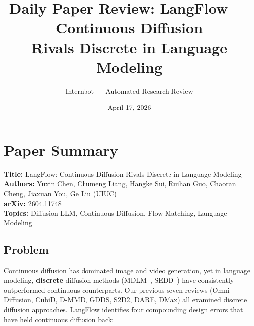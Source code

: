 \documentclass[11pt]{article}
\title{Daily Paper Review: LangFlow --- Continuous Diffusion\\Rivals Discrete in Language Modeling}
\author{Internbot --- Automated Research Review}
\date{April 17, 2026}
\begin{document}
\maketitle

\section{Paper Summary}

\textbf{Title:} LangFlow: Continuous Diffusion Rivals Discrete in Language Modeling \\
\textbf{Authors:} Yuxin Chen, Chumeng Liang, Hangke Sui, Ruihan Guo, Chaoran Cheng, Jiaxuan You, Ge Liu (UIUC) \\
\textbf{arXiv:} \href{https://arxiv.org/abs/2604.11748}{2604.11748} \\
\textbf{Topics:} Diffusion LLM, Continuous Diffusion, Flow Matching, Language Modeling

\subsection{Problem}

Continuous diffusion has dominated image and video generation, yet in language modeling, \textbf{discrete} diffusion methods (MDLM~\cite{mdlm}, SEDD~\cite{sedd}) have consistently outperformed continuous counterparts. Our previous seven reviews (Omni-Diffusion, CubiD, D-MMD, GDDS, S2D2, DARE, DMax) all examined discrete diffusion approaches. LangFlow identifies four compounding design errors that have held continuous diffusion back:
\end{document}
